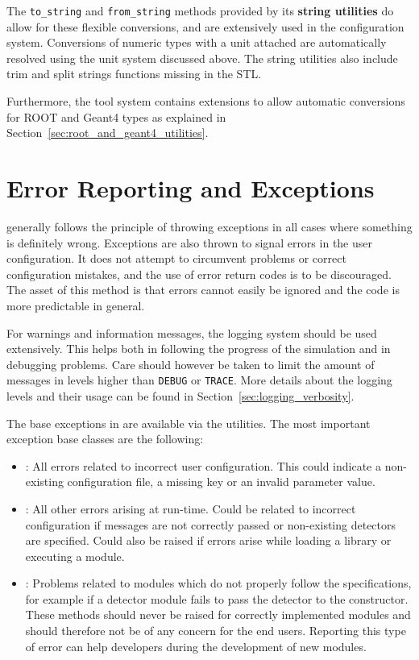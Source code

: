 The \apsq \texttt{to\_string} and \texttt{from\_string} methods provided by its \textbf{string utilities} do allow for these flexible conversions, and are extensively used in the configuration system.
Conversions of numeric types with a unit attached are automatically resolved using the unit system discussed above.
The string utilities also include trim and split strings functions missing in the STL.

Furthermore, the \apsq tool system contains extensions to allow automatic conversions for ROOT and Geant4 types as explained in Section~\ref{sec:root_and_geant4_utilities}.


\section{Error Reporting and Exceptions}
\label{sec:error_reporting_exceptions}
\apsq generally follows the principle of throwing exceptions in all cases where something is definitely wrong.
Exceptions are also thrown to signal errors in the user configuration.
It does not attempt to circumvent problems or correct configuration mistakes, and the use of error return codes is to be discouraged.
The asset of this method is that errors cannot easily be ignored and the code is more predictable in general.

For warnings and information messages, the logging system should be used extensively.
This helps both in following the progress of the simulation and in debugging problems.
Care should however be taken to limit the amount of messages in levels higher than \texttt{DEBUG} or \texttt{TRACE}.
More details about the logging levels and their usage can be found in Section~\ref{sec:logging_verbosity}.

The base exceptions in \apsq are available via the utilities.
The most important exception base classes are the following:
\begin{itemize}
\item {}: All errors related to incorrect user configuration.
This could indicate a non-existing configuration file, a missing key or an invalid parameter value.
\item {}: All other errors arising at run-time.
Could be related to incorrect configuration if messages are not correctly passed or non-existing detectors are specified.
Could also be raised if errors arise while loading a library or executing a module.
\item {}: Problems related to modules which do not properly follow the specifications, for example if a detector module fails to pass the detector to the constructor.
These methods should never be raised for correctly implemented modules and should therefore not be of any concern for the end users.
Reporting this type of error can help developers during the development of new modules.
\end{itemize}

